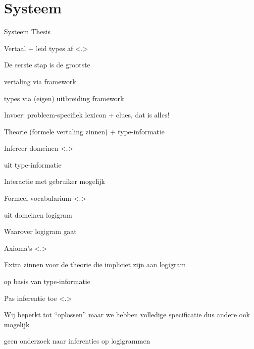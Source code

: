 \documentclass[notes, dvipsnames]{beamer}
\newcommand{\hitem}{
	\ppause
	\item
}
\newcommand{\ppause}{\onslide<+>}
\newcommand{\nnote}[1]{\note<.>{#1}}
\begin{document}
	\section{Systeem}
	\begin{frame}{Systeem Thesis}
		\begin{enumerate}
      \hitem Vertaal + leid types af
      \nnote{
        De eerste stap is de grootste
        \item vertaling via framework
        \item types via (eigen) uitbreiding framework
        \item Invoer: probleem-specifiek lexicon + clues, dat is alles!
        \item Theorie (formele vertaling zinnen) + type-informatie
      }
      \hitem Infereer domeinen
      \nnote{
        uit type-informatie
        \item Interactie met gebruiker mogelijk
      }
      \hitem Formeel vocabularium
      \nnote{
        uit domeinen logigram
        \item Waarover logigram gaat
      }
      \hitem Axioma's
      \nnote{
        Extra zinnen voor de theorie die impliciet zijn aan logigram
        \item op basis van type-informatie
      }
      \hitem Pas inferentie toe
      \nnote{
        Wij beperkt tot ``oplossen'' maar we hebben volledige specificatie dus andere ook mogelijk
        \item geen onderzoek naar inferenties op logigrammen
      }
		\end{enumerate}
	\end{frame}
\end{document}
